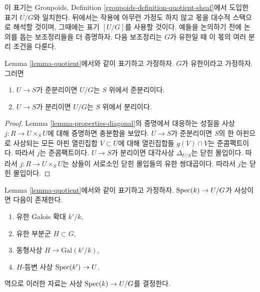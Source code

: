 \noindent
이 표기는 Groupoids, Definition
\ref{groupoids-definition-quotient-sheaf}에서 도입한 표기 $U/G$와
일치한다. 뒤에서는 작용에 아무런 가정도 하지 않고 몫을 대수적
스택으로 해석할 것이며, 그때에는 표기 $[U/G]$를 사용할 것이다.
예들을 논의하기 전에 논의를 돕는 보조정리들을 더 증명하자.
다음 보조정리는 $G$가 유한일 때 이 몫의 여러 분리 조건을 다룬다.

\begin{lemma}
\label{lemma-quotient-finite-separated}
Lemma \ref{lemma-quotient}에서와 같이 표기하고 가정하자.
$G$가 유한이라고 가정하자. 그러면
\begin{enumerate}
\item $U \to S$가 준분리이면 $U/G$는 $S$ 위에서 준분리이다.
\item $U \to S$가 분리이면 $U/G$는 $S$ 위에서 분리이다.
\end{enumerate}
\end{lemma}

\begin{proof}
Lemma \ref{lemma-properties-diagonal}의 증명에서 대응하는 성질을
사상 $j : R \to U \times_S U$에 대해 증명하면 충분함을 보았다.
$U \to S$가 준분리이면 $S$의 한 아핀으로 사상되는 모든 아핀 열린집합
$V \subset U$에 대해 열린집합들 $g(V) \cap V$는 준콤팩트이다.
따라서 $j$는 준콤팩트이다. $U \to S$가 분리이면 대각사상
$\Delta_{U/S}$는 닫힌 몰입이다. 따라서
$j : R \to U \times_S U$는 상들이 서로소인 닫힌 몰입들의 유한
쌍대곱이다. 따라서 $j$는 닫힌 몰입이다.
\end{proof}

\begin{lemma}
\label{lemma-quotient-field-map}
Lemma \ref{lemma-quotient}에서와 같이 표기하고 가정하자.
$\mathop{\mathrm{Spec}}(k) \to U/G$가 사상이면 다음이 존재한다.
\begin{enumerate}
\item 유한 Galois 확대 $k'/k$,
\item 유한 부분군 $H \subset G$,
\item 동형사상 $H \to \text{Gal}(k'/k)$,
\item $H$-등변 사상 $\mathop{\mathrm{Spec}}(k') \to U$.
\end{enumerate}
역으로 이러한 자료는 사상 $\mathop{\mathrm{Spec}}(k) \to U/G$를 결정한다.
\end{lemma}

